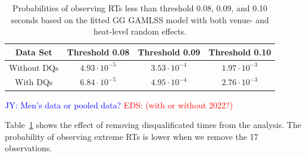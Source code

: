 \documentclass[12pt, letterpaper]{article}
\newcommand{\jy}[1]{\textcolor{blue}{JY: #1}}
\newcommand{\eds}[1]{\textcolor{red}{EDS: (#1)}}
\begin{document}
\begin{table}
  \centering
  \caption{Probabilities of observing RTs less than threshold 0.08,
  0.09, and 0.10 seconds based on the
    fitted GG GAMLSS model with both venue- and heat-level
random effects.}
  \begin{tabular}{c c c c}
   \toprule
   Data Set & Threshold 0.08 & Threshold 0.09 & Threshold 0.10  \\
   \midrule
   Without DQs & $4.93\cdot10^{-5}$ & $3.53\cdot10^{-4}$ &  $1.97\cdot10^{-3}$  \\
   With DQs & $6.84\cdot10^{-5}$ & $4.95\cdot10^{-4}$ & $2.76\cdot10^{-3}$ \\
   \bottomrule
  \end{tabular}
  \label{tab:DQSim_probability}
\end{table}

\jy{Men's data or pooled data?}
\eds{with or without 2022?}

Table~\ref{tab:DQSim_probability} shows the effect of removing disqualificated
times from the analysis.  The probability of observing extreme RTs is lower when
we remove the 17 observations.



\end{document}
